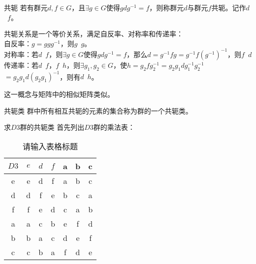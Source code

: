 
\begin{issues}
\issueDraft
\end{issues}
\begin{definition}{共轭}
若有群元$d,f\in G$，且$\exists g\in G$使得$gdg^{-1}=f$，则称群元$d$与群元$f$共轭。记作$d$~$f$。
\end{definition}

共轭关系是一个等价关系，满足自反率、对称率和传递率：\\
自反率：$g=ggg^{-1}$，则$g$~$g$。 \\
对称率：若$d$~$f$，则$\exists g\in G$使得$gdg^{-1}=f$，那么$d=g^{-1}fg=
g^{-1}f(g^{-1})^{-1}$，则$f$~$d$ \\
传递率：若$d$~$f$，$f$~$h$，则$\exists g_1,g_2\in G$，使$h=g_2fg_2^{-1}=
g_2g_1dg_1^{-1}g_2^{-1}$ $=g_2g_1d(g_2g_1)^{-1}$，则有$d$~$h$。

这一概念与矩阵中的相似矩阵类似。

\begin{definition}{共轭类}
群中所有相互共轭的元素的集合称为群的一个共轭类。
\end{definition}

\begin{example}{求$D3$群的共轭类}
首先列出$D3$群的乘法表：
\begin{table}[ht]
\centering
\caption{请输入表格标题}\label{gpcon_tab1}
\begin{tabular}{|c|c|c|c|c|c|c|}
\hline
        $D3$ & $e$ & $d$ & $f$ & a & b & c \\ \hline
        e & e & d & f & a & b & c \\ \hline
        d & d & f & e & b & c & a \\ \hline
        f & f & e & d & c & a & b \\ \hline
        a & a & c & b & e & f & d \\ \hline
        b & b & a & c & d & e & f \\ \hline
        c & c & b & a & f & d & e \\ \hline
\end{tabular}
\end{table}















\end{example}